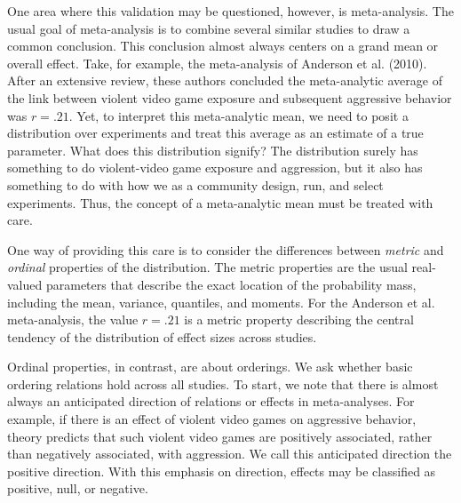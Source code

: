 \documentclass[english,man]{apa6}
\theoremstyle{definition}
\theoremstyle{definition}
\theoremstyle{definition}
\theoremstyle{remark}
\begin{document}
One area where this validation may be questioned, however, is
meta-analysis. The usual goal of meta-analysis is to combine several
similar studies to draw a common conclusion. This conclusion almost
always centers on a grand mean or overall effect. Take, for example, the
meta-analysis of Anderson et al. (2010). After an extensive review,
these authors concluded the meta-analytic average of the link between
violent video game exposure and subsequent aggressive behavior was
\(r=.21\). Yet, to interpret this meta-analytic mean, we need to posit a
distribution over experiments and treat this average as an estimate of a
true parameter. What does this distribution signify? The distribution
surely has something to do violent-video game exposure and aggression,
but it also has something to do with how we as a community design, run,
and select experiments. Thus, the concept of a meta-analytic mean must
be treated with care.

One way of providing this care is to consider the differences between
\emph{metric} and \emph{ordinal} properties of the distribution. The
metric properties are the usual real-valued parameters that describe the
exact location of the probability mass, including the mean, variance,
quantiles, and moments. For the Anderson et al. meta-analysis, the value
\(r=.21\) is a metric property describing the central tendency of the
distribution of effect sizes across studies.

Ordinal properties, in contrast, are about orderings. We ask whether
basic ordering relations hold across all studies. To start, we note that
there is almost always an anticipated direction of relations or effects
in meta-analyses. For example, if there is an effect of violent video
games on aggressive behavior, theory predicts that such violent video
games are positively associated, rather than negatively associated, with
aggression. We call this anticipated direction the positive direction.
With this emphasis on direction, effects may be classified as positive,
null, or negative.
\end{document}
